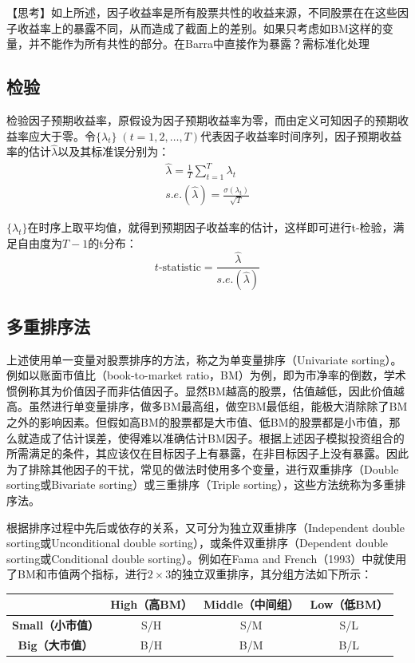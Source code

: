 \documentclass[11pt]{article}
\begin{document}
【思考】如上所述，因子收益率是所有股票共性的收益来源，不同股票在在这些因子收益率上的暴露不同，从而造成了截面上的差别。如果只考虑如BM这样的变量，并不能作为所有共性的部分。在Barra中直接作为暴露？需标准化处理

\subsection{检验}

检验因子预期收益率，原假设为因子预期收益率为零，而由定义可知因子的预期收益率应大于零。令$\{\lambda_t\} \; (t=1,2,\dots,T)$代表因子收益率时间序列，因子预期收益率的估计$\hat{\lambda}$以及其标准误分别为：
\begin{gather*}
    \hat{\lambda} = \frac{1}{T}\sum_{t=1}^{T} \lambda_t \\
    s.e.(\hat{\lambda}) = \frac{\sigma(\lambda_t)}{\sqrt{T}}
\end{gather*}

$\{\lambda_t\}$在时序上取平均值，就得到预期因子收益率的估计，这样即可进行t-检验，满足自由度为$T-1$的t分布：
\begin{equation*}
    t\text{-statistic} = \frac{\hat{\lambda}}{s.e.(\hat{\lambda})}
\end{equation*}

\subsection{多重排序法}

上述使用单一变量对股票排序的方法，称之为单变量排序（Univariate sorting）。例如以账面市值比（book-to-market ratio，BM）为例，即为市净率的倒数，学术惯例称其为价值因子而非估值因子。显然BM越高的股票，估值越低，因此价值越高。虽然进行单变量排序，做多BM最高组，做空BM最低组，能极大消除除了BM之外的影响因素。但假如高BM的股票都是大市值、低BM的股票都是小市值，那么就造成了估计误差，使得难以准确估计BM因子。根据上述因子模拟投资组合的所需满足的条件，其应该仅在目标因子上有暴露，在非目标因子上没有暴露。因此为了排除其他因子的干扰，常见的做法时使用多个变量，进行双重排序（Double sorting或Bivariate sorting）或三重排序（Triple sorting），这些方法统称为多重排序法。

根据排序过程中先后或依存的关系，又可分为独立双重排序（Independent double sorting或Unconditional double sorting），或条件双重排序（Dependent double sorting或Conditional double sorting）。例如在Fama and French（1993）中就使用了BM和市值两个指标，进行$2 \times 3$的独立双重排序，其分组方法如下所示：

\begin{table}[H]
\centering
\begin{tabular}{@{}cccc@{}}
\toprule
& \textbf{High（高BM）} & \textbf{Middle（中间组）} & \textbf{Low（低BM）} \\ \midrule
\textbf{Small（小市值）} & S/H & S/M & S/L \\
\textbf{Big（大市值）}   & B/H & B/M & B/L \\ \bottomrule
\end{tabular}
\end{table}
\end{document}

